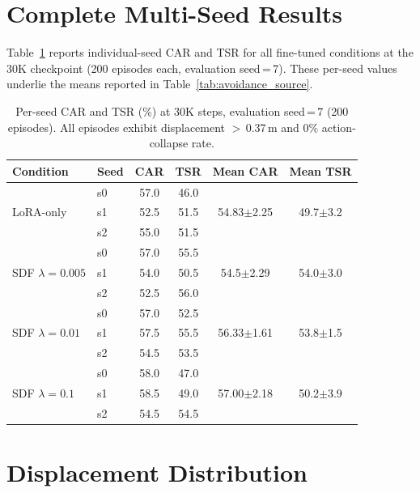 \section{Complete Multi-Seed Results}
\label{sec:appendix_multiseed}

Table~\ref{tab:multiseed_full} reports individual-seed CAR and TSR for all fine-tuned conditions at the 30K checkpoint (200 episodes each, evaluation seed\,=\,7). These per-seed values underlie the means reported in Table~\ref{tab:avoidance_source}.

\begin{table}[h]
\centering
\caption{Per-seed CAR and TSR (\%) at 30K steps, evaluation seed\,=\,7 (200 episodes). All episodes exhibit displacement $>$\,0.37\,m and 0\% action-collapse rate.}
\label{tab:multiseed_full}
\vspace{2pt}
\footnotesize
\begin{tabular*}{\columnwidth}{l@{\extracolsep{\fill}}lcccc}
\toprule
Condition & Seed & CAR & TSR & Mean CAR & Mean TSR \\
\midrule
\multirow{3}{*}{LoRA-only}
  & s0 & 57.0 & 46.0 & \multirow{3}{*}{54.83$\pm$2.25} & \multirow{3}{*}{49.7$\pm$3.2} \\
  & s1 & 52.5 & 51.5 & & \\
  & s2 & 55.0 & 51.5 & & \\
\midrule
\multirow{3}{*}{SDF $\lambda{=}0.005$}
  & s0 & 57.0 & 55.5 & \multirow{3}{*}{54.5$\pm$2.29} & \multirow{3}{*}{54.0$\pm$3.0} \\
  & s1 & 54.0 & 50.5 & & \\
  & s2 & 52.5 & 56.0 & & \\
\midrule
\multirow{3}{*}{SDF $\lambda{=}0.01$}
  & s0 & 57.0 & 52.5 & \multirow{3}{*}{56.33$\pm$1.61} & \multirow{3}{*}{53.8$\pm$1.5} \\
  & s1 & 57.5 & 55.5 & & \\
  & s2 & 54.5 & 53.5 & & \\
\midrule
\multirow{3}{*}{SDF $\lambda{=}0.1$}
  & s0 & 58.0 & 47.0 & \multirow{3}{*}{57.00$\pm$2.18} & \multirow{3}{*}{50.2$\pm$3.9} \\
  & s1 & 58.5 & 49.0 & & \\
  & s2 & 54.5 & 54.5 & & \\
\bottomrule
\end{tabular*}
\end{table}

\section{Displacement Distribution}
\label{sec:appendix_displacement}

